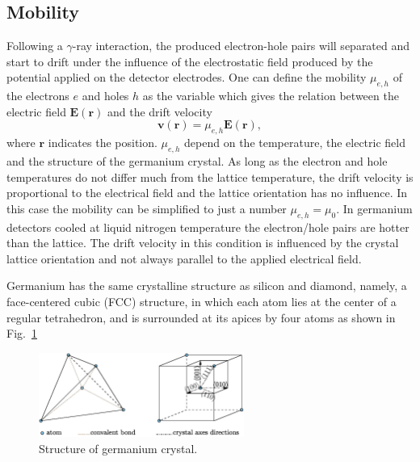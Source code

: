 \subsection{Mobility}
\label{sec:pss:mobi}
Following a $\gamma$-ray interaction, the produced electron-hole pairs
will separated and start to drift under the influence of the
electrostatic field produced by the potential applied on the detector
electrodes. One can define the mobility $\mu_{e,h}$ of the electrons
$e$ and holes $h$ as the variable which gives the relation between the
electric field $\mathbf{E}(\mathbf{r})$ and the drift velocity
\begin{equation}
  \label{eq:pss:mobi}
  \mathbf{v}(\mathbf{r}) = \mu_{e,h} \mathbf{E}(\mathbf{r}),
\end{equation}
where $\mathbf{r}$ indicates the position. $\mu_{e,h}$ depend on the
temperature, the electric field and the structure of the germanium
crystal. As long as the electron and hole temperatures do not differ
much from the lattice temperature, the drift velocity is proportional
to the electrical field and the lattice orientation has no influence.
In this case the mobility can be simplified to just a number
$\mu_{e,h} = \mu_{0}$. In germanium detectors cooled at liquid
nitrogen temperature the electron/hole pairs are hotter than the
lattice. The drift velocity in this condition is influenced by the
crystal lattice orientation and not always parallel to the applied
electrical field.

Germanium has the same crystalline structure as silicon and diamond, namely, a face-centered cubic (FCC) structure, in which each atom lies at the center of a regular tetrahedron, and is surrounded at its apices by four atoms as shown in Fig.~\ref{fig:pss:xtal}
\begin{figure}[tbhp]
  \centering
  \includegraphics[width=0.6\textwidth]{xtalStruc}  
  \caption{Structure of germanium crystal.}
  \label{fig:pss:xtal}
\end{figure}

